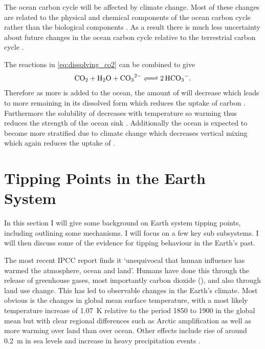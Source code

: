 The ocean carbon cycle will be affected by climate change. Most of these changes are related to the physical and
chemical components of the ocean carbon cycle rather than the biological components \parencite{AR6}. As a result there is much less uncertainty about future changes in the
ocean carbon cycle relative to the terrestrial carbon cycle \parencite{Arora2020}.

The reactions in \cref{eq:dissolving_co2} can be combined to give
\begin{equation}
  \label{eq:dissolving_co2_combined}
  \ce{CO2 + H2O + CO3^{2-} <=> 2HCO3^-}.
\end{equation}
Therefore as more  is added to the ocean, the amount of  will decrease which leads to
more  remaining in its dissolved form which reduces the uptake of carbon \parencite{Archer2010,Egleston2010}. Furthermore the solubility of  decreases with
temperature so warming thus reduces the strength of the ocean sink \parencite{Weiss1974}. Additionally the ocean is expected to become more
stratified due to climate change which decreases vertical mixing which again reduces the uptake of  \parencite{DeVries2017}. 


\section{Tipping Points in the Earth System}
In this section I will give some background on Earth system tipping points, including outlining some mechanisms.
I will focus on a few key sub subsystems. I will then discuss some of the evidence for tipping behaviour in the Earth's past.

The most recent IPCC report \parencite{AR6} finds it `unequivocal that human influence has warmed the atmosphere, ocean and land'. Humans have done this through the release of greenhouse
gases, most importantly carbon dioxide (), and also through land use change. This has led to observable changes in the Earth's climate. Most obvious is the changes in global mean surface
temperature, with a most likely temperature increase of \SI{1.07}{\kelvin} relative to the period 1850 to 1900 \parencite{AR6} in the
global mean but with clear regional differences \parencite{Morice2021} such as
Arctic amplification as well as more warming over land than over ocean. Other effects include rise of around \SI{0.2}{\meter} in sea levels \parencite{Frederikse2020} and increase in heavy precipitation
events \parencite{Fischer2016}.

